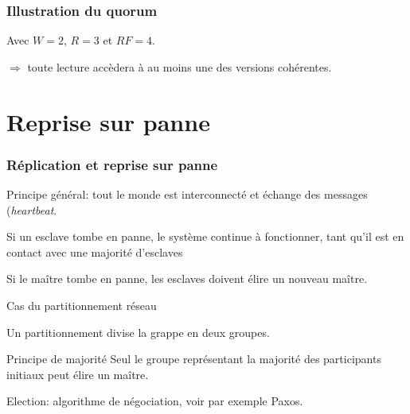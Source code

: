 \begin{frame}
\frametitle{Illustration du quorum}

Avec $W=2$, $R=3$ et $RF=4$.

\vfill


\vfill
$\Rightarrow$ toute lecture accèdera à \alert{au moins}
une des versions cohérentes.

\end{frame}

\section{Reprise sur panne}

\begin{frame}
\frametitle{Réplication et reprise sur panne}

Principe général: tout le monde est interconnecté et échange des messages
(\textit{heartbeat}.


\vfill

  Si un \alert{esclave} tombe en panne, le système continue à fonctionner, \alert{tant qu'il est en contact
    avec une majorité d'esclaves}
 
 \vfill
 
 Si le \alert{maître} tombe en panne, les \alert{esclaves} doivent \alert{élire} 
 un nouveau maître.

\end{frame}

\begin{frame}{Cas du partitionnement réseau}

Un \alert{partitionnement} divise la grappe en deux groupes.


\begin{remblock}{Principe de majorité}
Seul le groupe représentant la \alert{majorité} des participants initiaux peut élire
un maître.
\end{remblock}

Election: algorithme de négociation, voir par exemple Paxos.

\end{frame}



